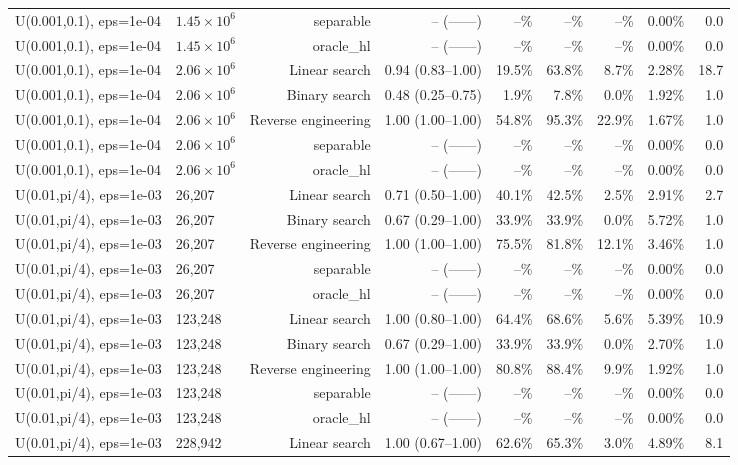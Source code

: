 \begin{tabular}{llrrrrrrr}
U(0.001,0.1), eps=1e-04 & $1.45\times 10^{6}$ & separable & -- (------) & --\% & --\% & --\% & 0.00\% & 0.0 \\
U(0.001,0.1), eps=1e-04 & $1.45\times 10^{6}$ & oracle_hl & -- (------) & --\% & --\% & --\% & 0.00\% & 0.0 \\
U(0.001,0.1), eps=1e-04 & $2.06\times 10^{6}$ & Linear search & 0.94 (0.83--1.00) & 19.5\% & 63.8\% & 8.7\% & 2.28\% & 18.7 \\
U(0.001,0.1), eps=1e-04 & $2.06\times 10^{6}$ & Binary search & 0.48 (0.25--0.75) & 1.9\% & 7.8\% & 0.0\% & 1.92\% & 1.0 \\
U(0.001,0.1), eps=1e-04 & $2.06\times 10^{6}$ & Reverse engineering & 1.00 (1.00--1.00) & 54.8\% & 95.3\% & 22.9\% & 1.67\% & 1.0 \\
U(0.001,0.1), eps=1e-04 & $2.06\times 10^{6}$ & separable & -- (------) & --\% & --\% & --\% & 0.00\% & 0.0 \\
U(0.001,0.1), eps=1e-04 & $2.06\times 10^{6}$ & oracle_hl & -- (------) & --\% & --\% & --\% & 0.00\% & 0.0 \\
U(0.01,pi/4), eps=1e-03 & 26,207 & Linear search & 0.71 (0.50--1.00) & 40.1\% & 42.5\% & 2.5\% & 2.91\% & 2.7 \\
U(0.01,pi/4), eps=1e-03 & 26,207 & Binary search & 0.67 (0.29--1.00) & 33.9\% & 33.9\% & 0.0\% & 5.72\% & 1.0 \\
U(0.01,pi/4), eps=1e-03 & 26,207 & Reverse engineering & 1.00 (1.00--1.00) & 75.5\% & 81.8\% & 12.1\% & 3.46\% & 1.0 \\
U(0.01,pi/4), eps=1e-03 & 26,207 & separable & -- (------) & --\% & --\% & --\% & 0.00\% & 0.0 \\
U(0.01,pi/4), eps=1e-03 & 26,207 & oracle_hl & -- (------) & --\% & --\% & --\% & 0.00\% & 0.0 \\
U(0.01,pi/4), eps=1e-03 & 123,248 & Linear search & 1.00 (0.80--1.00) & 64.4\% & 68.6\% & 5.6\% & 5.39\% & 10.9 \\
U(0.01,pi/4), eps=1e-03 & 123,248 & Binary search & 0.67 (0.29--1.00) & 33.9\% & 33.9\% & 0.0\% & 2.70\% & 1.0 \\
U(0.01,pi/4), eps=1e-03 & 123,248 & Reverse engineering & 1.00 (1.00--1.00) & 80.8\% & 88.4\% & 9.9\% & 1.92\% & 1.0 \\
U(0.01,pi/4), eps=1e-03 & 123,248 & separable & -- (------) & --\% & --\% & --\% & 0.00\% & 0.0 \\
U(0.01,pi/4), eps=1e-03 & 123,248 & oracle_hl & -- (------) & --\% & --\% & --\% & 0.00\% & 0.0 \\
U(0.01,pi/4), eps=1e-03 & 228,942 & Linear search & 1.00 (0.67--1.00) & 62.6\% & 65.3\% & 3.0\% & 4.89\% & 8.1 \\

\end{tabular}
